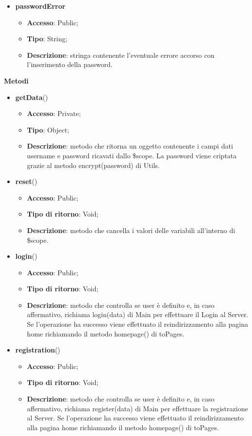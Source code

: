 {{\begin{itemize}
\begin{itemize}
			\end{itemize}
			\item \textbf{passwordError}
			\begin{itemize}
				\item \textbf{Accesso}: Public;
				\item \textbf{Tipo}: String;
				\item \textbf{Descrizione}: stringa contenente l'eventuale errore accorso con l'inserimento della password.
			\end{itemize}
	    \end{itemize}
		\textbf{Metodi}
		\begin{itemize}
			\item \textbf{getData}()
			\begin{itemize}
				\item \textbf{Accesso}: Private;
				\item \textbf{Tipo}: Object;
				\item \textbf{Descrizione}: metodo che ritorna un oggetto contenente i campi dati username e password ricavati dallo \$scope. La password viene criptata grazie al metodo encrypt(password) di Utils.
			\end{itemize}
			\item \textbf{reset}()
			\begin{itemize}
				\item \textbf{Accesso}: Public;
				\item \textbf{Tipo di ritorno}: Void;
				\item \textbf{Descrizione}: metodo che cancella i valori delle variabili all'interno di \$scope.
			\end{itemize}
			\item \textbf{login}()
			\begin{itemize}
				\item \textbf{Accesso}: Public;
				\item \textbf{Tipo di ritorno}: Void;
				\item \textbf{Descrizione}: metodo che controlla se user è definito e, in caso affermativo, richiama login(data) di Main per effettuare il Login\ped{g} al Server. Se l'operazione ha successo viene effettuato il reindirizzamento alla pagina home richiamando il metodo homepage() di toPages.
			\end{itemize}
	        \item \textbf{registration}()
			\begin{itemize}
				\item \textbf{Accesso}: Public;
				\item \textbf{Tipo di ritorno}: Void;
				\item \textbf{Descrizione}: metodo che controlla se user è definito e, in caso affermativo, richiama register(data) di Main per effettuare la registrazione al Server. Se l'operazione ha successo viene effettuato il reindirizzamento alla pagina home richiamando il metodo homepage() di toPages.
			\end{itemize}
		\end{itemize}
	}
}
